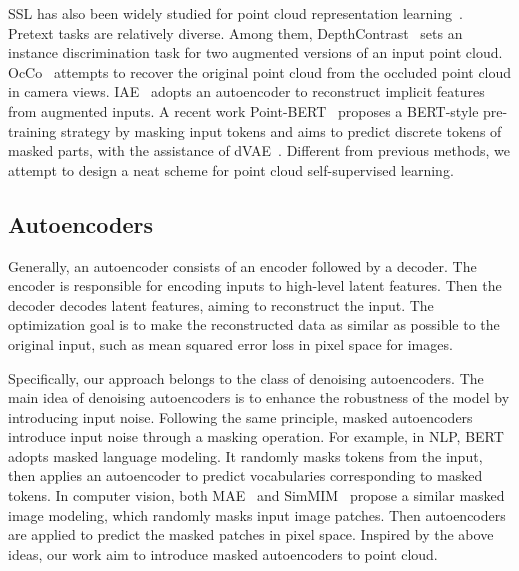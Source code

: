 \documentclass[runningheads]{llncs}
\begin{document}
SSL has also been widely studied for point cloud representation learning~\cite{ptocco,ptdeepcon,ptssl1,ptssl2,ptssl3,ptssl4,foldingnet,ptssl6,ptssl7,ptiae}. Pretext tasks are relatively diverse. Among them, DepthContrast~\cite{ptdeepcon} sets an instance discrimination task for two augmented versions of an input point cloud. OcCo~\cite{ptocco} attempts to recover the original point cloud from the occluded point cloud in camera views. IAE~\cite{ptiae} adopts an autoencoder to reconstruct implicit features from augmented inputs. A recent work Point-BERT~\cite{pointbert} proposes a BERT-style pre-training strategy by masking input tokens and aims to predict discrete tokens of masked parts, with the assistance of dVAE~\cite{dvae}. Different from previous methods, we attempt to design a neat scheme for point cloud self-supervised learning.

\subsection{Autoencoders}

Generally, an autoencoder consists of an encoder followed by a decoder. The encoder is responsible for encoding inputs to high-level latent features. Then the decoder decodes latent features, aiming to reconstruct the input. The optimization goal is to make the reconstructed data as similar as possible to the original input, such as mean squared error loss in pixel space for images. 

Specifically, our approach belongs to the class of denoising autoencoders. The main idea of denoising autoencoders is to enhance the robustness of the model by introducing input noise. Following the same principle, masked autoencoders introduce input noise through a masking operation. For example, in NLP, BERT~\cite{bert} adopts masked language modeling. It randomly masks tokens from the input, then applies an autoencoder to predict vocabularies corresponding to masked tokens. In computer vision, both MAE~\cite{mae} and SimMIM~\cite{simmim} propose a similar masked image modeling, which randomly masks input image patches. Then autoencoders are applied to predict the masked patches in pixel space. Inspired by the above ideas, our work aim to introduce masked autoencoders to point cloud.
\end{document}
